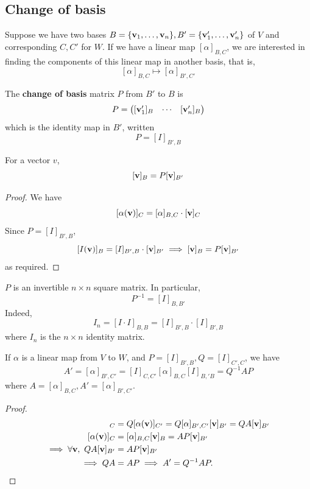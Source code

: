\documentclass[a4paper,11pt]{article}
\begin{document}
\subsection{Change of basis}
Suppose we have two bases $ B = \qty{{\bf v}_1, \dots, {\bf v}_n}, B' = \qty{{\bf v}_1', \dots, {\bf v}_n'} $ of $ V $ and corresponding $ C, C' $ for $ W $.
If we have a linear map $ [\alpha]_{B,C} $, we are interested in finding the components of this linear map in another basis, that is,
\[
	[\alpha]_{B,C} \mapsto [\alpha]_{B',C'}
\]
\begin{definition}
	The \textbf{change of basis} matrix $ P $ from $ B' $ to $ B $ is
	\[
		P = \begin{pmatrix}
			[{\bf v}_1']_B & \cdots & [{\bf v}_n']_B
		\end{pmatrix}
	\]
	which is the identity map in $ B' $, written
	\[
		P = [I]_{B', B}
	\]
\end{definition}
\begin{lemma}
	For a vector $ v $,
	\[
		[{\bf v}]_B = P [{\bf v}]_{B'}
	\]
\end{lemma}
\begin{proof}
	We have
	\[
		[\alpha({\bf v})]_C = [\alpha]_{B,C} \cdot [{\bf v}]_C
	\]
	Since $ P = [I]_{B', B} $,
	\[
		[I({\bf v})]_B = [I]_{B', B} \cdot [{\bf v}]_{B'} \implies [{\bf v}]_B = P[{\bf v}]_{B'}
	\]
	as required.
\end{proof}
\begin{remark}
	$ P $ is an invertible $ n \times n $ square matrix.
	In particular,
	\[
		P^{-1} = [I]_{B,B'}
	\]
	Indeed,
	\[
		I_n = [I \cdot I]_{B,B} = [I]_{B',B} \cdot [I]_{B',B}
	\]
	where $ I_n $ is the $ n \times n $ identity matrix.
\end{remark}
\begin{proposition}
	If $ \alpha $ is a linear map from $ V $ to $ W $, and $ P = [I]_{B',B}, Q = [I]_{C',C} $, we have
	\[
		A' = [\alpha]_{B',C'} = [I]_{C,C'}[\alpha]_{B,C}[I]_{B,'B} = Q^{-1}AP
	\]
	where $ A = [\alpha]_{B,C}, A' = [\alpha]_{B',C'} $.
\end{proposition}
\begin{proof}
	\begin{align*}
		[\alpha(\bfv)]_C                     &= Q [\alpha(\bfv)]_{C'}= Q [\alpha]_{B',C'} [\bfv]_{B'} = QA [\mathbf{v}]_{B'} \\
		[\alpha(\bfv)]_C                     & = [\alpha]_{B,C} [\bfv]_B        = AP[\bfv]_{B'}                  \\
		\implies \forall \bfv,\ QA[\bfv]_{B'} & = AP[\bfv]_{B'}                  \\
		\implies QA                     & = AP \implies A'=Q^{-1}AP.\qedhere
	\end{align*}
\end{proof}
\end{document}
